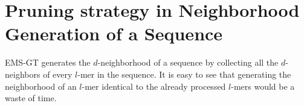 \section{Pruning strategy in Neighborhood Generation of a Sequence}
EMS-GT generates the $d$-neighborhood of a sequence by collecting all the $d$-neighbors of every $l$-mer in the sequence. It is easy to see that generating the neighborhood of an $l$-mer identical to the already processed $l$-mers would be a waste of time.


